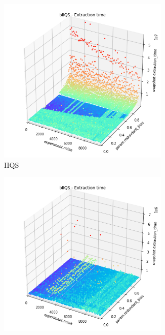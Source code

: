 \begin{figure}
    \centering
    \begin{subfigure}[b]{0.45\textwidth}
        \centering
        \includegraphics[width=0.9\textwidth]{./fragments/05_workhorse_experiment/images/01_basebenchmark_06_noise_redundant_bias.png.1_0.png}
        \caption{IIQS}
        \label{FIG:WORKHORSE_BENCHMARK_05__0_0}
    \end{subfigure}
    \hfill
    \begin{subfigure}[b]{0.45\textwidth}
        \centering
        \includegraphics[width=0.9\textwidth]{./fragments/05_workhorse_experiment/images/01_basebenchmark_06_noise_redundant_bias.png.0_0.png}

\end{subfigure}
\end{figure}

